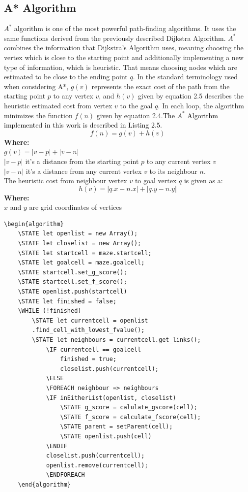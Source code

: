 \subsection{A* Algorithm}
$A^*$ algorithm is one of the most powerful path-finding algorithms. It uses the same functions derived from the previously described Dijkstra Algorithm. $A^*$ combines the information that Dijkstra’s Algorithm uses, meaning choosing the vertex which is close to the starting point and additionally implementing a new type of information, which is heuristic. That means choosing nodes which are estimated to be close to the ending point $q$. 
In the standard terminology used when considering A*, $g(v)$ represents the exact cost of the path from the starting point $p$ to any vertex $v$, and $h(v)$ given by equation 2.5 describes the heuristic estimated cost from vertex $v$ to the goal $q$. In each loop, the algorithm minimizes the function $f(n)$ given by equation 2.4.\textcolor{black}{The $A^*$ Algorithm implemented in this work is described in Listing 2.5}.
\begin{equation}
f(n) = g(v) + h(v)
\end{equation}
\textbf{Where:}\\
$g(v)= |v - p| + |v - n|$\\
$|v - p|$ it's a distance from the starting point $p$ to any current vertex $v$\\
$|v - n|$ it's a distance from any current vertex $v$ to its neighbour $n$.\\
\newline
The heuristic cost from neighbour vertex $v$ to goal vertex $q$ is given as a:
\begin{equation}
h(v) = |q.x - n.x| + |q.y - n.y|
\end{equation}
\textbf{Where:}\\
$x$ and $y$ are grid coordinates of vertices\\

\begin{lstlisting}[caption={Pseudocode for a A* algorithm}]
	\begin{algorithm}
	\STATE let openlist = new Array();
	\STATE let closelist = new Array();
	\STATE let startcell = maze.startcell;
	\STATE let goalcell = maze.goalcell;
	\STATE startcell.set_g_score();
	\STATE startcell.set_f_score();
	\STATE openlist.push(startcell)
	\STATE let finished = false;
	\WHILE (!finished)
		\STATE let currentcell = openlist    
		.find_cell_with_lowest_fvalue();
		\STATE let neighbours = currentcell.get_links();
			\IF currentcell == goalcell
				finished = true;
				closelist.push(currentcell);
			\ELSE 
			\FOREACH neighbour => neighbours	
			\IF inEitherList(openlist, closelist)
				\STATE g_score = calulate_gscore(cell);
				\STATE f_score = calculate_fscore(cell);
				\STATE parent = setParent(cell);
				\STATE openlist.push(cell)
			\ENDIF
			closelist.push(currentcell);
			openlist.remove(currentcell);
	    	\ENDFOREACH
	\end{algorithm}
	\end{lstlisting}
%